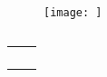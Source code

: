 \documentclass[a4paper,fleqn]{cas-dc}
\begin{document}
\begin{figure}[<options>]
	\centering
		\texttt{[image: ]}
	  \caption{}\label{fig1}
\end{figure}


\begin{table}[<options>]
\caption{}\label{tbl1}
\begin{tabular*}{\tblwidth}{@{}LL@{}}
\toprule
  &  \\ %
\midrule
 & \\
 & \\
 & \\
 & \\
\bottomrule
\end{tabular*}
\end{table}




\section{}\label{}

\printcredits

%




\bio{}
\endbio

\endbio
\end{document}
